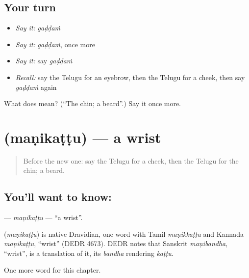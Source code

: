 \subsection*{Your turn}
\begin{itemize}
\raggedright
  \item \emph{Say it:} \emph{gaḍḍaṁ}
  \item \emph{Say it:} \emph{gaḍḍaṁ}, once more
  \item \emph{Say it:} say \emph{gaḍḍaṁ}
  \item \emph{Recall:} say the Telugu for an eyebrow, then the Telugu for a cheek, then say \emph{gaḍḍaṁ} again
\end{itemize}

\begin{tcolorbox}[breakable,colback=teal!4,colframe=teal!35!black,title={Before you move on}]
What does  mean? (\textquotedblleft{}The chin; a beard\textquotedblright{}.) Say it once more.
\end{tcolorbox}
\section[\texorpdfstring{\te{మణికట్టు} (maṇikaṭṭu)}{మణికట్టు (maṇikaṭṭu)}]{ (maṇikaṭṭu) — a wrist}

\label{lesson:TE-C128-manikattu}



\begin{quote}
Before the new one: say the Telugu for a cheek, then the Telugu for the chin; a beard.
\end{quote}

\subsection*{You'll want to know: }
\textbf{} — \emph{maṇikaṭṭu} — \textquotedblleft{}a wrist\textquotedblright{}.

\begin{cousinweb}
\textbf{} (\emph{maṇikaṭṭu}) is native Dravidian, one word with Tamil \emph{maṇikkaṭṭu} and Kannada \emph{maṇikaṭṭu}, \textquotedblleft{}wrist\textquotedblright{} (DEDR 4673). DEDR notes that Sanskrit \emph{maṇibandha}, \textquotedblleft{}wrist\textquotedblright{}, is a translation of it, its \emph{bandha} rendering \emph{kaṭṭu}.
\end{cousinweb}

\begin{grammarlens}[title={What you've built}]
One more word for this chapter.
\end{grammarlens}

